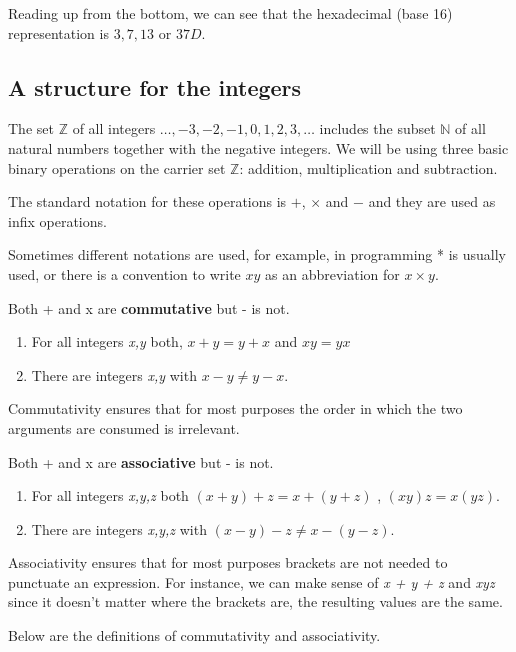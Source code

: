 Reading up from the bottom, we can see that the hexadecimal (base 16)
representation is $3,7,13$ or $37D$.

\subsection{A structure for the integers}

The set $\mathbb{Z}$ of all integers $\ldots,-3,-2,-1,0,1,2,3,\ldots$ includes
the subset $\mathbb{N}$ of all natural numbers together with the negative
integers. We will be using three basic binary operations on the carrier set
$\mathbb{Z}$: addition, multiplication and subtraction.

The standard notation for these operations is $+$, $\times$ and $-$ and they are
used as infix operations.

Sometimes different notations are used, for example, in programming * is usually
used, or there is a convention to write $xy$ as an abbreviation for $x \times
y$.
 
Both + and x are {\bf commutative} but - is not.

\begin{enumerate}
\item For all integers {\it x,y} both, $x + y = y + x$ and $xy = yx$
\item There are integers {\it x,y} with $x - y \ne y - x$.
\end{enumerate}

Commutativity ensures that for most purposes the order in which the two
arguments are consumed is irrelevant.

Both + and x are {\bf associative} but - is not.

\begin{enumerate}
\item For all integers {\it x,y,z} both $(x + y) + z = x + (y + z)$ , $(xy)z = x(yz)$.
\item There are integers {\it x,y,z} with $(x - y) - z \ne x - (y - z)$.
\end{enumerate}

Associativity ensures that for most purposes brackets are not needed to
punctuate an expression. For instance, we can make sense of {\it x + y + z} and
{\it xyz} since it doesn't matter where the brackets are, the resulting values
are the same.

Below are the definitions of commutativity and associativity.


